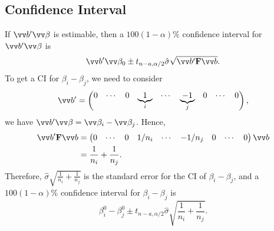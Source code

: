 \subsection*{Confidence Interval}
If $ \Vector{b}'\Vector{\beta} $ is estimable, then a $ 100(1-\alpha)\% $
confidence interval for $ \Vector{b}'\Vector{\beta} $ is
\[ \Vector{b}'\Vector{\beta}_0\pm t_{n-a,\alpha/2}\hat{\sigma}\sqrt{\Vector{b}'\Matrix{F}\Vector{b}}. \]
To get a CI for $ \beta_i-\beta_j $, we need to consider
\[ \Vector{b}'=\begin{pmatrix}
        0 & \cdots & 0 & \underbrace{1}_i & \cdots & \underbrace{-1}_{j} & 0 & \cdots & 0
    \end{pmatrix}, \]
we have $ \Vector{b}'\Vector{\beta}=\Vector{\beta}_i-\Vector{\beta}_j $. Hence,
\begin{align*}
    \Vector{b}'\Matrix{F}\Vector{b}
     & =\begin{pmatrix}
            0 & \cdots & 0 & 1/n_i & \cdots & -1/n_j & 0 & \cdots & 0
        \end{pmatrix}\Vector{b} \\
     & =\frac{1}{n_i}+\frac{1}{n_j}.
\end{align*}
Therefore, $ \hat{\sigma}\sqrt{\frac{1}{n_i}+\frac{1}{n_j}} $ is the standard
error for the CI of $ \beta_i-\beta_j $, and a $ 100(1-\alpha)\% $ confidence
interval for $ \beta_i-\beta_j $ is
\[ \beta_i^0-\beta_j^0\pm t_{n-a,\alpha/2}\hat{\sigma}\sqrt{\frac{1}{n_i}+\frac{1}{n_j}}. \]
